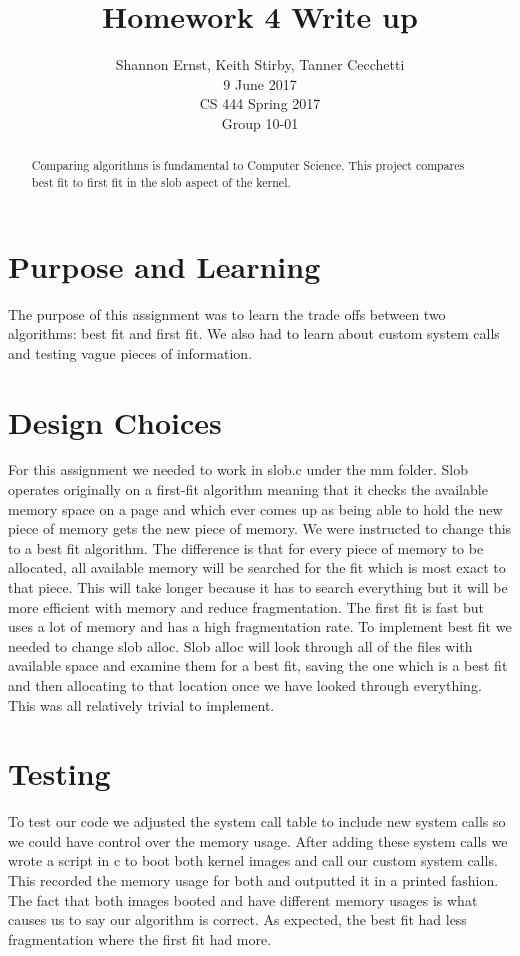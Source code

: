 \documentclass[letterpaper,10pt,serif,draftclsnofoot,onecolumn,compsoc,titlepage]{IEEEtran}
\title{Homework 4 Write up}
\author{Shannon Ernst, Keith Stirby, Tanner Cecchetti\\ 9 June 2017 \\ CS 444 Spring 2017 \\ Group 10-01}
\begin{document}
\maketitle
\begin{abstract}
Comparing algorithms is fundamental to Computer Science. This project 
compares best fit to first fit in the slob aspect of the kernel. 
\end{abstract}
\newpage
\tableofcontents
\newpage
\section{Purpose and Learning}
The purpose of this assignment was to learn the trade offs between two algorithms: 
best fit and first fit. We also had to learn about custom system calls and 
testing vague pieces of information. 
\section{Design Choices}
For this assignment we needed to work in slob.c under the mm folder. Slob operates 
originally on a first-fit algorithm meaning that it checks the available memory space 
on a page and which ever comes up as being able to hold the new piece of memory gets 
the new piece of memory. We were instructed to change this to a best fit algorithm. 
The difference is that for every piece of memory to be allocated, all available memory 
will be searched for the fit which is most exact to that piece. This will take longer 
because it has to search everything but it will be more efficient with memory and reduce
 fragmentation. The first fit is fast but uses a lot of memory and has a high fragmentation 
 rate. To implement best fit we needed to change slob alloc. Slob alloc 
 will look through all of the files with available space and examine them for a best fit, 
 saving the one which is a best fit and then allocating to that location once we have looked 
 through everything. This was all relatively trivial to implement.
\section{Testing}
To test our code we adjusted the system call table to include new system calls so we 
could have control over the memory usage. After adding these system calls we wrote a 
script in c to boot both kernel images and call our custom system calls. This recorded 
the memory usage for both and outputted it in a printed fashion. The fact that both images 
booted and have different memory usages is what causes us to say our algorithm is correct. 
As expected, the best fit had less fragmentation where the first fit had more.
\end{document}
